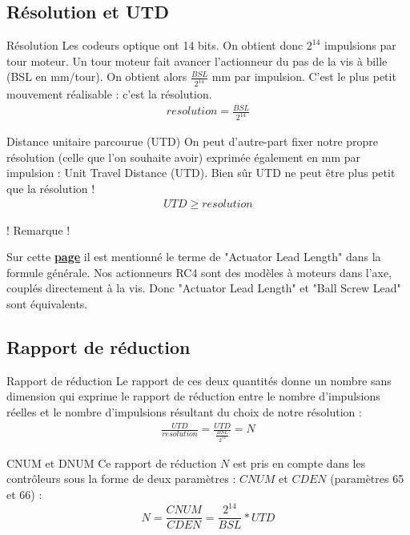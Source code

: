 \documentclass[a4paper,11pt]{beamer}
\begin{document}
\subsection{Résolution et UTD}
\begin{frame}
\begin{alertblock}{Résolution}
\justifying
Les codeurs optique ont 14 bits. On obtient donc $2^{14}$ impulsions par tour moteur. Un tour moteur fait avancer l'actionneur du pas de la vis à bille (BSL en mm/tour). On obtient alors $\frac{BSL}{2^{14}}$ mm par impulsion. C'est le plus petit mouvement réalisable : c'est la résolution.
\begin{align*}
resolution = \frac{BSL}{2^{14}}
\end{align*}
\end{alertblock}

\begin{alertblock}{Distance unitaire parcourue (UTD)}
\justifying
On peut d'autre-part fixer notre propre résolution (celle que l'on souhaite avoir) exprimée également en mm par impulsion : Unit Travel Distance (UTD). Bien sûr UTD ne peut être plus petit que la résolution ! 
\begin{align*}
UTD \geq resolution
\end{align*}
\end{alertblock}
\end{frame}

\begin{frame}
\centering
! Remarque !
\vspace{1cm}

\justifying
Sur cette \textcolor{blue}{\textbf{\underline{\href{https://raw.githubusercontent.com/fbuloup/Interface_IAI/main/Documentation/SCON-CB_CGB(ME0340-8A).pdf\#page=257}{page}}}} il est mentionné le terme de "Actuator Lead Length" dans la formule générale. Nos actionneurs RC4 sont des modèles à moteurs dans l'axe, couplés directement à la vis. Donc "Actuator Lead Length" et "Ball Screw Lead" sont équivalents.
\end{frame}

\subsection{Rapport de réduction}
\begin{frame}
\begin{alertblock}{Rapport de réduction}
\justifying
Le rapport de ces deux quantités donne un nombre sans dimension qui exprime le rapport de réduction entre le nombre d'impulsions réelles et le nombre d'impulsions résultant du choix de notre résolution : 
\begin{align*}
\frac{UTD}{resolution} = \frac{UTD}{\frac{BSL}{2^{14}}} = N
\end{align*}
\end{alertblock}
\begin{alertblock}{CNUM et DNUM}
\justifying
Ce rapport de réduction $N$ est pris en compte dans les contrôleurs sous la forme de deux paramètres : $CNUM$ et $CDEN$ (paramètres 65 et 66) : 
$$
N=\frac{CNUM}{CDEN}=\frac{2^{14}}{BSL}*UTD
$$
\end{alertblock}
\end{frame}
\end{document}
